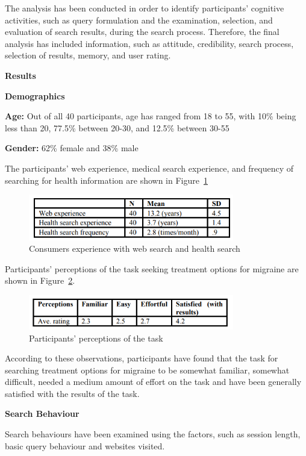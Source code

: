 \documentclass[]{article}
\begin{document}
The analysis has been conducted in order to identify participants’ cognitive activities, such as query formulation and the examination, selection, and evaluation of search results, during the search process. Therefore, the final analysis has included information, such as attitude, credibility, search process, selection of results, memory, and user rating.

\textbf{Results}

\textbf{Demographics}

\textbf{Age:} Out of all 40 participants, age has ranged from 18 to 55, with 10\% being less than 20, 77.5\% between 20-30, and 12.5\% between 30-55

\textbf{Gender:} 62\% female and 38\% male

The participants’ web experience, medical search experience, and frequency of searching for health information are shown in Figure~\ref{fig1} 

\begin{figure}[t!]
	\includegraphics[width=0.8\textwidth]{Capture1.png}
	\caption{Consumers experience with web search and health search\label{fig1}}
\end{figure}  

Participants’ perceptions of the task seeking treatment options for migraine are shown in Figure~\ref{fig2}.

\begin{figure}[b!]
	\includegraphics[width=0.8\textwidth]{Capture2.png}
	\caption{Participants’ perceptions of the task \label{fig2}}
\end{figure} 

According to these observations, participants have found that the task for searching treatment options for migraine to be somewhat familiar, somewhat difficult, needed a medium amount of effort on the task and have been generally satisfied with the results of the task. 

\textbf{Search Behaviour}

Search behaviours have been examined using the factors, such as session length, basic query behaviour and websites visited.
\end{document}
